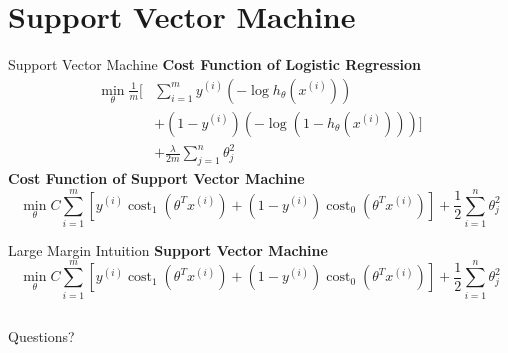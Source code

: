 \documentclass[9pt,dvipsnames]{beamer}
\begin{document}
	\section{Support Vector Machine}
	\begin{frame}{Support Vector Machine}
		\textbf{Cost Function of Logistic Regression}
		\begin{align*}
			\min _\theta \frac{1}{m}\Bigg[ & \sum_{i=1}^m y^{(i)}\left(-\log h_\theta\left(x^{(i)}\right)\right) \\
			& + \left(1-y^{(i)}\right)\left(-\log \left(1-h_\theta\left(x^{(i)}\right)\right)\right)\Bigg] \\
			& + \frac{\lambda}{2 m} \sum_{j=1}^n \theta_j^2 
		\end{align*}
		\textbf{Cost Function of Support Vector Machine}
		$$
		\min _\theta C \sum_{i=1}^m\left[y^{(i)} \operatorname{cost}_1\left(\theta^T x^{(i)}\right)+\left(1-y^{(i)}\right) \operatorname{cost}_0\left(\theta^T x^{(i)}\right)\right]+\frac{1}{2} \sum_{i=1}^n \theta_j^2
		$$
	\end{frame}
	
	\begin{frame}{Large Margin Intuition}
		\textbf{Support Vector Machine}
		$$
		\min _\theta C \sum_{i=1}^m\left[y^{(i)} \operatorname{cost}_1\left(\theta^T x^{(i)}\right)+\left(1-y^{(i)}\right) \operatorname{cost}_0\left(\theta^T x^{(i)}\right)\right]+\frac{1}{2} \sum_{i=1}^n \theta_j^2
		$$
		\begin{columns}
			
		\end{columns}
	\end{frame}
	
	\begin{frame}
		\begin{center}
			\Huge Questions?
		\end{center}
	\end{frame}
\end{document}
